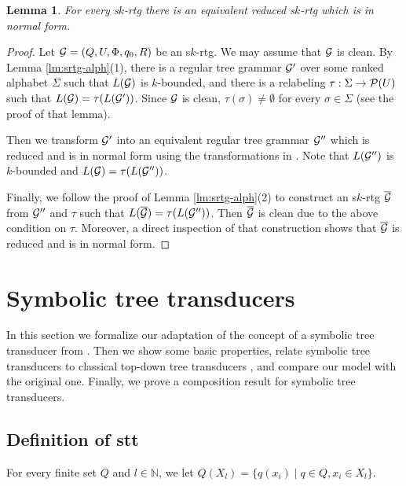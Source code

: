 \documentclass[10pt]{scrartcl}
\newtheorem{lm}[df]{Lemma}
\newcommand{\nat}{\mathbb{N}}
\newcommand{\G}{{\cal G}}
\begin{document}
\begin{lm}\rm \label{lm:srtg-normal-form} For every s$k$-rtg  there is an equivalent reduced s$k$-rtg which is in
  normal form.
\end{lm} 
\begin{proof} Let $\G = (Q,U,\Phi,q_0,R)$ be an s$k$-rtg. We may assume that $\G$ is clean.
By Lemma
  \ref{lm:srtg-alph}(1), there is a regular tree grammar $\G'$ over some ranked alphabet $\Sigma$ 
such that $L(\G)$ is $k$-bounded, and there is a
  relabeling $\tau: \Sigma \rightarrow {\cal P}(U)$ such that $L(\G) =
  \tau(L(\G'))$. Since $\G$ is clean, $\tau(\sigma)\neq  \emptyset$ for every $\sigma \in \Sigma$ (see  the proof of that lemma).



Then we transform $\G'$ into an equivalent regular tree grammar
  $\G''$ which is reduced and is in normal form using the transformations in \cite[Prop. 2.1.3, 2.1.4]{comdaugiljaclugtistom97}.
Note that $L(\G'')$ is $k$-bounded and $L(\G) =  \tau(L(\G''))$.

Finally, we follow the proof of Lemma  \ref{lm:srtg-alph}(2) to construct an s$k$-rtg $\overline{\G}$ from $\G''$ and $\tau$ such that $L(\overline{\G}) =  \tau(L(\G''))$. Then $\overline{\G}$ is clean due to the above condition on $\tau$. Moreover,
a direct inspection of that construction shows that $\overline{\G}$ is reduced and is in normal form.
\end{proof}




\section{Symbolic tree transducers}

In this section we formalize our adaptation of the concept of a symbolic tree transducer from \cite{veabjo11a,veabjo11b}. Then we show some basic properties, relate symbolic tree transducers to classical top-down tree transducers  \cite{tha70,rou70,eng75}, and compare our model with the original one. Finally, we prove a composition result for symbolic tree transducers.


\subsection{Definition of stt}\label{sect:stt-def}

For every finite set $Q$ and $l \in \nat$, we let $Q(X_l) =
\{q(x_i) \mid q \in Q, x_i \in X_l\}$. 
\end{document}
